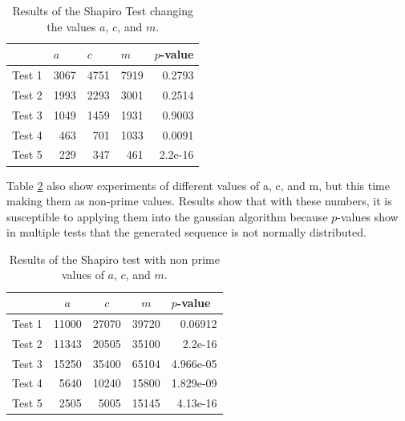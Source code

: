 \documentclass[10pt,leter,openany]{article}
\begin{document}
			\begin{table}[]
				\centering
				\caption{Results of the Shapiro Test changing the values $a$, $c$, and $m$.}
				\label{tab:muller_acm}
				\begin{tabular}{@{}lrrrr@{}}
					\toprule
					& \multicolumn{1}{l}{$ a $} & \multicolumn{1}{l}{$ c $} & \multicolumn{1}{l}{$ m $} & \multicolumn{1}{l}{$ p $-value} \\ \midrule
					Test 1  & 3067                  & 4751                  & 7919                  & 0.2793                      \\
					Test 2 & 1993                  & 2293                  & 3001                  & 0.2514                      \\
					Test 3 & 1049                  & 1459                  & 1931                  & 0.9003                      \\
					Test 4 & 463                   & 701                   & 1033                  & 0.0091                      \\
					Test 5 & 229                   & 347                   & 461                   & 2.2e-16                     \\ \bottomrule
				\end{tabular}
			\end{table}

		Table \ref{tab:muller_nonprime} also show experiments of different values of a, c, and m, but this time making them as non-prime values. Results show that with these numbers, it is susceptible to applying them into the gaussian algorithm because $p$-values show in multiple tests that the generated sequence is not normally distributed. 


			\begin{table}[]
				\centering
				\caption{Results of the Shapiro test with non prime values of $a$, $ c$, and $m$.}
				\label{tab:muller_nonprime}
				\begin{tabular}{@{}lrrrr@{}}
					\toprule
					& \multicolumn{1}{c}{$ a $} & \multicolumn{1}{c}{$ c $} & \multicolumn{1}{c}{$ m $} & \multicolumn{1}{l}{$ p $-value} \\ \midrule
					Test 1  & 11000                 & 27070                 & 39720                 & 0.06912                     \\
					Test 2 & 11343                 & 20505                 & 35100                 & 2.2e-16                     \\
					Test 3 & 15250                 & 35400                 & 65104                 & 4.966e-05                   \\
					Test 4 & 5640                  & 10240                 & 15800                 & 1.829e-09                   \\
					Test 5 & 2505                  & 5005                  & 15145                 & 4.13e-16                    \\ \bottomrule
				\end{tabular}
			\end{table}
\end{document}
